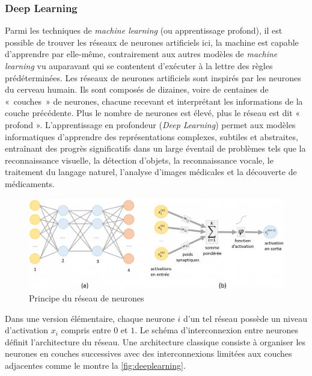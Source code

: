 \subsubsection{Deep Learning}
    Parmi les techniques de \textit{machine learning} (ou apprentissage profond), il est possible de trouver les réseaux de neurones artificiels ici, la machine est capable d'apprendre par elle-même, contrairement aux autres modèles de \textit{machine learning} vu auparavant qui se contentent d'exécuter à la lettre des règles prédéterminées. Les réseaux de neurones artificiels sont inspirés par les neurones du cerveau humain. Ils sont composés de dizaines, voire de centaines de « couches » de neurones, chacune recevant et interprétant les informations de la couche précédente. Plus le nombre de neurones est élevé, plus le réseau est dit « profond ». L'apprentissage en profondeur (\textit{Deep Learning}) permet aux modèles informatiques d'apprendre des représentations complexes, subtiles et abstraites, entraînant des progrès significatifs dans un large éventail de problèmes tels que la reconnaissance visuelle, la détection d'objets, la reconnaissance vocale, le traitement du langage naturel, l'analyse d'images médicales et la découverte de médicaments.

\begin{figure}[ht!]
    \centering
    \includegraphics[width=0.6\linewidth]{Rapport/images/deepLearning.png}
    \caption{Principe du réseau de neurones}
    \label{fig:deeplearning}
\end{figure}

Dans une version élémentaire, chaque neurone $i$ d’un tel réseau possède un niveau d’activation $x_i$ compris entre $0$ et $1$. Le schéma d’interconnexion entre neurones définit l’architecture du réseau. Une architecture classique consiste à organiser les neurones en couches successives avec des interconnexions limitées aux couches adjacentes comme le montre la \autoref{fig:deeplearning}.

